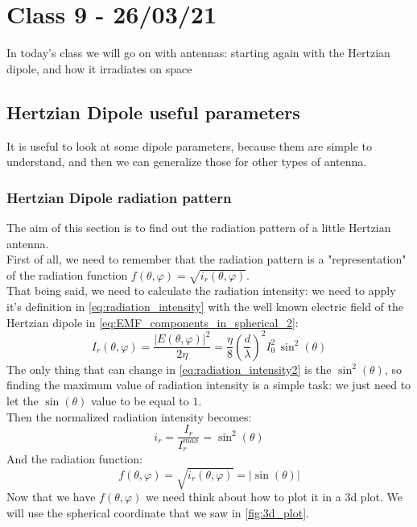 \section{Class 9 - 26/03/21}
In today's class we will go on with antennas: starting again with the Hertzian dipole, and how it irradiates on space
\subsection*{Hertzian Dipole useful parameters}
It is useful to look at some dipole parameters, because them are simple to understand, and then we can generalize those for other types of antenna.
\subsubsection*{Hertzian Dipole radiation pattern}
The aim of this section is to find out the radiation pattern of a little Hertzian antenna.\\
First of all, we need to remember that the radiation pattern is a "representation" of the radiation function $f(\theta,\varphi)=\sqrt{i_r(\theta,\varphi)}$.\\
That being said, we need to calculate the radiation intensity: we need to apply it's definition in \cref{eq:radiation_intensity} with the well known electric field of the Hertzian dipole in \cref{eq:EMF_components_in_spherical_2}:
\begin{equation}\label{eq:radiation_intensity2}
    I_r(\theta, \varphi)=\frac{|E(\theta,\varphi)|^2}{2\eta}=\frac{\eta}{8}\left(\frac{d}{\lambda}\right)^2I_0^2\,\sin^2(\theta)
\end{equation}
The only thing that can change in \cref{eq:radiation_intensity2} is the $\sin^2(\theta)$, so finding the maximum value of radiation intensity is a simple task: we just need to let the $\sin(\theta)$ value to be equal to $1$.\\
Then the normalized radiation intensity becomes:
\begin{equation}\label{eq:normalized_rad_intensity}
    i_r=\frac{I_r}{I_r^{max}}=\sin^2(\theta)
\end{equation}
And the radiation function:
\begin{equation}
    f(\theta,\varphi)=\sqrt{i_r(\theta,\varphi)}=|\sin(\theta)|
\end{equation}
Now that we have $f(\theta, \varphi)$ we need think about how to plot it in a 3d plot. We will use the spherical coordinate that we saw in \cref{fig:3d_plot}.\\
